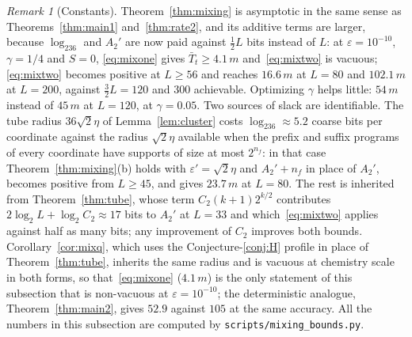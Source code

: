 \documentclass[aps,prx,twocolumn,superscriptaddress,nofootinbib,longbibliography]{revtex4-2}
\theoremstyle{plain}
\theoremstyle{definition}
\theoremstyle{remark}
\newtheorem{remark}{Remark}
\begin{document}
\begin{remark}[Constants]\label{rem:mixconst}
Theorem~\ref{thm:mixing} is asymptotic in the same sense as Theorems~\ref{thm:main1} and~\ref{thm:rate2}, and its additive terms are larger, because $\log_236$ and $A_2'$ are now paid against $\tfrac12L$ bits instead of $L$: at $\varepsilon=10^{-10}$, $\gamma=1/4$ and $S=0$, \eqref{eq:mixone} gives $\bar T_t\ge4.1\,m$ and~\eqref{eq:mixtwo} is vacuous; \eqref{eq:mixtwo} becomes positive at $L\ge56$ and reaches $16.6\,m$ at $L=80$ and $102.1\,m$ at $L=200$, against $\tfrac32L=120$ and $300$ achievable. Optimizing $\gamma$ helps little: $54\,m$ instead of $45\,m$ at $L=120$, at $\gamma=0.05$. Two sources of slack are identifiable. The tube radius $36\sqrt2\eta$ of Lemma~\ref{lem:cluster} costs $\log_236\approx5.2$ coarse bits per coordinate against the radius $\sqrt2\eta$ available when the prefix and suffix programs of every coordinate have supports of size at most $2^{n_f}$: in that case Theorem~\ref{thm:mixing}(b) holds with $\varepsilon'=\sqrt2\eta$ and $A_2'+n_f$ in place of $A_2'$, becomes positive from $L\ge45$, and gives $23.7\,m$ at $L=80$. The rest is inherited from Theorem~\ref{thm:tube}, whose term $C_2(k+1)2^{k/2}$ contributes $2\log_2L+\log_2C_2\approx17$ bits to $A_2'$ at $L=33$ and which~\eqref{eq:mixtwo} applies against half as many bits; any improvement of $C_2$ improves both bounds. Corollary~\ref{cor:mixq}, which uses the Conjecture-\ref{conj:H} profile in place of Theorem~\ref{thm:tube}, inherits the same radius and is vacuous at chemistry scale in both forms, so that~\eqref{eq:mixone} ($4.1\,m$) is the only statement of this subsection that is non-vacuous at $\varepsilon=10^{-10}$; the deterministic analogue, Theorem~\ref{thm:main2}, gives $52.9$ against $105$ at the same accuracy. All the numbers in this subsection are computed by \texttt{scripts/mixing\_bounds.py}.
\end{remark}
\end{document}
